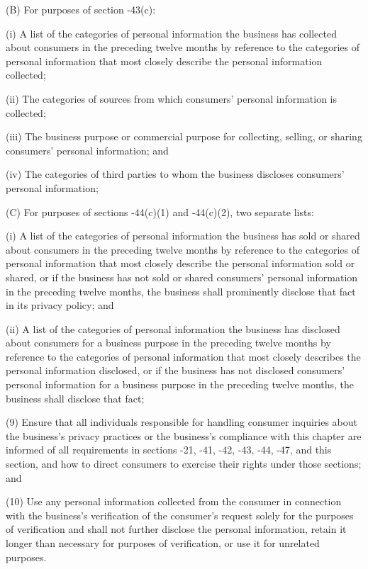           (B)  For purposes of section    -43(c):

               (i)  A list of the categories of personal information the business has collected about consumers in the preceding twelve months by reference to the categories of personal information that most closely describe the personal information collected;

              (ii)  The categories of sources from which consumers' personal information is collected;

             (iii)  The business purpose or commercial purpose for collecting, selling, or sharing consumers' personal information; and

              (iv)  The categories of third parties to whom the business discloses consumers' personal information;

          (C)  For purposes of sections    -44(c)(1) and    ‑44(c)(2), two separate lists:

               (i)  A list of the categories of personal information the business has sold or shared about consumers in the preceding twelve months by reference to the categories of personal information that most closely describe the personal information sold or shared, or if the business has not sold or shared consumers' personal information in the preceding twelve months, the business shall prominently disclose that fact in its privacy policy; and

              (ii)  A list of the categories of personal information the business has disclosed about consumers for a business purpose in the preceding twelve months by reference to the categories of personal information that most closely describes the personal information disclosed, or if the business has not disclosed consumers' personal information for a business purpose in the preceding twelve months, the business shall disclose that fact;

     (9)  Ensure that all individuals responsible for handling consumer inquiries about the business's privacy practices or the business's compliance with this chapter are informed of all requirements in sections    -21,    -41,    -42,    -43,    -44,    ‑47, and this section, and how to direct consumers to exercise their rights under those sections; and

    (10)  Use any personal information collected from the consumer in connection with the business's verification of the consumer's request solely for the purposes of verification and shall not further disclose the personal information, retain it longer than necessary for purposes of verification, or use it for unrelated purposes.

